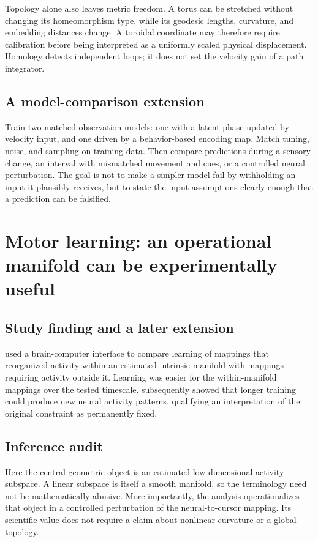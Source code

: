 Topology alone also leaves metric freedom. A torus can be stretched without changing its homeomorphism type, while its geodesic lengths, curvature, and embedding distances change. A toroidal coordinate may therefore require calibration before being interpreted as a uniformly scaled physical displacement. Homology detects independent loops; it does not set the velocity gain of a path integrator.

\subsection{A model-comparison extension}
Train two matched observation models: one with a latent phase updated by velocity input, and one driven by a behavior-based encoding map. Match tuning, noise, and sampling on training data. Then compare predictions during a sensory change, an interval with mismatched movement and cues, or a controlled neural perturbation. The goal is not to make a simpler model fail by withholding an input it plausibly receives, but to state the input assumptions clearly enough that a prediction can be falsified.

\section{Motor learning: an operational manifold can be experimentally useful}
\subsection{Study finding and a later extension}
\citet{app_sadtler2014} used a brain-computer interface to compare learning of mappings that reorganized activity within an estimated intrinsic manifold with mappings requiring activity outside it. Learning was easier for the within-manifold mappings over the tested timescale. \citet{ev_oby2019} subsequently showed that longer training could produce new neural activity patterns, qualifying an interpretation of the original constraint as permanently fixed.

\subsection{Inference audit}
Here the central geometric object is an estimated low-dimensional activity subspace. A linear subspace is itself a smooth manifold, so the terminology need not be mathematically abusive. More importantly, the analysis operationalizes that object in a controlled perturbation of the neural-to-cursor mapping. Its scientific value does not require a claim about nonlinear curvature or a global topology.

